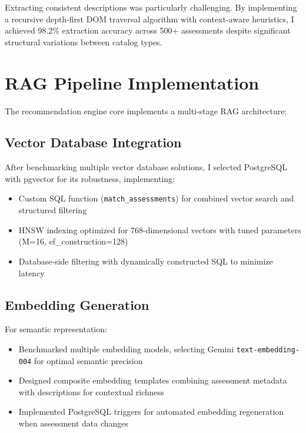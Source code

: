 \documentclass[10pt,a4paper,twocolumn]{article}
\begin{document}
Extracting consistent descriptions was particularly challenging. By implementing a recursive depth-first DOM traversal algorithm with context-aware heuristics, I achieved 98.2\% extraction accuracy across 500+ assessments despite significant structural variations between catalog types.

\section{RAG Pipeline Implementation}
\small
The recommendation engine core implements a multi-stage RAG architecture:

\subsection{Vector Database Integration}
\small
After benchmarking multiple vector database solutions, I selected PostgreSQL with pgvector for its robustness, implementing:
\begin{itemize}[leftmargin=*,itemsep=2pt,topsep=0pt,parsep=0pt]
    \item Custom SQL function (\texttt{match\_assessments}) for combined vector search and structured filtering
    \item HNSW indexing optimized for 768-dimensional vectors with tuned parameters (M=16, ef\_construction=128)
    \item Database-side filtering with dynamically constructed SQL to minimize latency
\end{itemize}

\subsection{Embedding Generation}
\small
For semantic representation:
\begin{itemize}[leftmargin=*,itemsep=2pt,topsep=0pt,parsep=0pt]
    \item Benchmarked multiple embedding models, selecting Gemini \texttt{text-embedding-004} for optimal semantic precision
    \item Designed composite embedding templates combining assessment metadata with descriptions for contextual richness
    \item Implemented PostgreSQL triggers for automated embedding regeneration when assessment data changes
\end{itemize}
\end{document}
